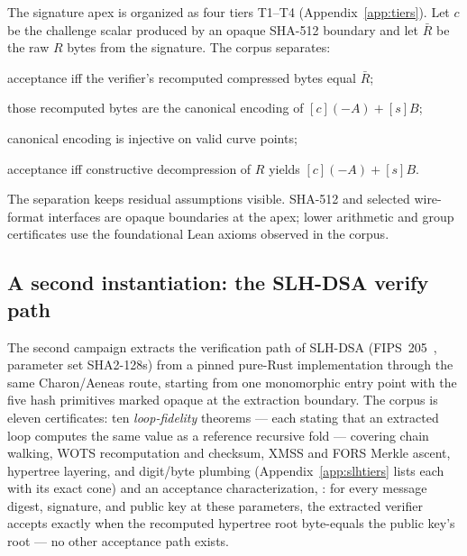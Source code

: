 \documentclass[11pt]{article}
\theoremstyle{remark}
\newcommand{\code}[1]{\texttt{\detokenize{#1}}}
\begin{document}
The signature apex is organized as four tiers T1--T4
(Appendix~\ref{app:tiers}). Let $c$ be the challenge scalar produced by an opaque SHA-512 boundary and let $\bar R$ be the raw $R$ bytes
from the signature. The corpus separates:
\begin{description}[leftmargin=1.5em,itemsep=2pt]
\item[T1:] acceptance iff the verifier's recomputed compressed bytes equal
$\bar R$;
\item[T2:] those recomputed bytes are the canonical encoding of
$[c](-A)+[s]B$;
\item[T3:] canonical encoding is injective on valid curve points;
\item[T4:] acceptance iff constructive decompression of $R$ yields
$[c](-A)+[s]B$.
\end{description}

The separation keeps residual assumptions visible. SHA-512 and selected
wire-format interfaces are opaque boundaries at the apex; lower arithmetic and
group certificates use the foundational Lean axioms observed in the corpus.

\subsection{A second instantiation: the SLH-DSA verify path}\label{sec:slhdsa}

The second campaign extracts the verification path of SLH-DSA
(FIPS~205~\cite{fips205},
parameter set SHA2-128s) from a pinned pure-Rust implementation through the
same Charon/Aeneas route, starting from one monomorphic entry point with the
five hash primitives marked opaque at the extraction boundary. The corpus is
eleven certificates: ten \emph{loop-fidelity} theorems --- each stating
that an extracted loop computes the same value as a reference recursive
fold --- covering chain walking, WOTS recomputation and checksum, XMSS and
FORS Merkle ascent, hypertree layering, and digit/byte plumbing
(Appendix~\ref{app:slhtiers} lists each with its exact cone) and an acceptance characterization,
\code{slh_verify_128s_accepts_iff}: for every message digest, signature, and
public key at these parameters, the extracted verifier accepts exactly when
the recomputed hypertree root byte-equals the public key's root --- no other
acceptance path exists.
\end{document}
